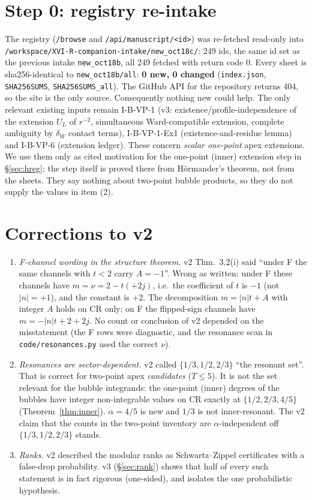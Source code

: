 \documentclass[11pt]{article}
\theoremstyle{definition}
\begin{document}
\section{Step 0: registry re-intake}\label{sec:intake}
The registry (\texttt{/browse} and \texttt{/api/manuscript/<id>}) was re-fetched read-only into \texttt{/workspace/XVI-R-companion-intake/new\_oct18c/}: 249 ids, the same id set as the previous intake \texttt{new\_oct18b}, all 249 fetched with return code 0. Every sheet is sha256-identical to \texttt{new\_oct18b/all}: \textbf{0 new, 0 changed} (\texttt{index.json}, \texttt{SHA256SUMS}, \texttt{SHA256SUMS\_all}). The GitHub API for the repository returns 404, so the site is the only source. Consequently nothing new could help. The only relevant existing inputs remain I-B-VP-1 (v3: existence/profile-independence of the extension $U_L$ of $r^{-2}$, simultaneous Ward-compatible extension, complete ambiguity by $\delta_W$ contact terms), I-B-VP-1-Ex1 (existence-and-residue lemma) and I-B-VP-6 (extension ledger). These concern \emph{scalar one-point} apex extensions. We use them only as cited motivation for the one-point (inner) extension step in \S\ref{sec:hreg}; the step itself is proved there from Hörmander's theorem, not from the sheets. They say nothing about two-point bubble products, so they do not supply the values in item (2).

\section{Corrections to v2}\label{sec:corr}
\begin{enumerate}
\item \emph{F-channel wording in the structure theorem.} v2 Thm.~3.2(i) said ``under F the same channels with $t<2$ carry $A=-1$''. Wrong as written: under F these channels have $m=\nu=2-t(+2j)$, i.e.\ the coefficient of $t$ is $-1$ (not $|n|=+1$), and the constant is $+2$. The decomposition $m=|n|t+A$ with integer $A$ holds on CR only; on F the flipped-sign channels have $m=-|n|t+2+2j$. No count or conclusion of v2 depended on the misstatement (the F rows were diagnostic, and the resonance scan in \texttt{code/resonances.py} used the correct $\nu$).
\item \emph{Resonances are sector-dependent.} v2 called $\{1/3,1/2,2/3\}$ ``the resonant set''. That is correct for two-point apex \emph{candidates} ($T\le5$). It is not the set relevant for the bubble integrands: the one-point (inner) degrees of the bubbles have integer non-integrable values on CR exactly at $\{1/2,2/3,4/5\}$ (Theorem~\ref{thm:inner}). $\alpha=4/5$ is new and $1/3$ is not inner-resonant. The v2 claim that the counts in the two-point inventory are $\alpha$-independent off $\{1/3,1/2,2/3\}$ stands.
\item \emph{Ranks.} v2 described the modular ranks as Schwartz--Zippel certificates with a false-drop probability. v3 (\S\ref{sec:rank}) shows that half of every such statement is in fact rigorous (one-sided), and isolates the one probabilistic hypothesis.
\end{enumerate}
\end{document}
